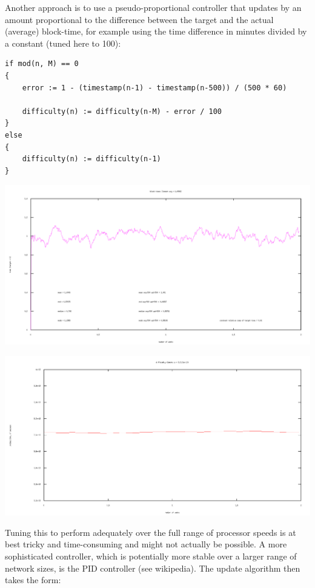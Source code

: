 \documentclass[10pt,a4paper]{article}
\begin{document}
Another approach is to use a pseudo-proportional controller that updates by an amount proportional to the difference between the target and the actual (average) block-time, for example using the time difference in minutes divided by a constant (tuned here to 100):

\begin{verbatim}
if mod(n, M) == 0
{
    error := 1 - (timestamp(n-1) - timestamp(n-500)) / (500 * 60)
        
    difficulty(n) := difficulty(n-M) - error / 100
}
else
{
    difficulty(n) := difficulty(n-1)
}
\end{verbatim}

\includegraphics[width=14cm]{SimulationGraphs/simulation_avg-500_upd-500_Pcontroller.png}

\includegraphics[width=14cm]{SimulationGraphs/simulation_avg-500_upd-500_Pcontroller_diff.png}

Tuning this to perform adequately over the full range of processor speeds is at best tricky and time-consuming and might not actually be possible. A more sophisticated controller, which is potentially more stable over a larger range of network sizes, is the PID controller (see wikipedia). The update algorithm then takes the form:
\end{document}
